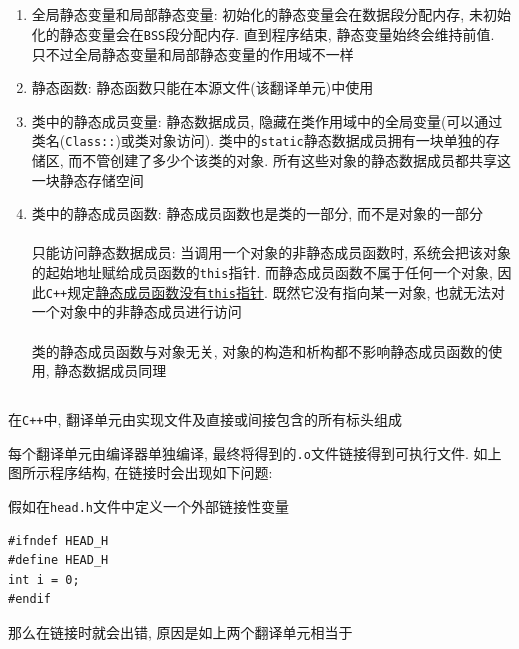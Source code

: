 \subsection{}
\begin{enumerate}
	\item 全局静态变量和局部静态变量: 初始化的静态变量会在数据段分配内存, 未初始化的静态变量会在{\tt BSS}段分配内存. 
			直到程序结束, 静态变量始终会维持前值. 只不过全局静态变量和局部静态变量的作用域不一样
	\item 静态函数: 静态函数只能在本源文件(该翻译单元)中使用
	\item 类中的静态成员变量: 静态数据成员, 隐藏在类作用域中的全局变量(可以通过类名({\tt Class::})或类对象访问). 
			类中的{\tt static}静态数据成员拥有一块单独的存储区, 而不管创建了多少个该类的对象. 
			所有这些对象的静态数据成员都共享这一块静态存储空间
	\item 类中的静态成员函数: 静态成员函数也是类的一部分, 而不是对象的一部分
		\\ \\  只能访问静态数据成员: 
			当调用一个对象的非静态成员函数时, 系统会把该对象的起始地址赋给成员函数的{\tt this}指针. 
			而静态成员函数不属于任何一个对象, 因此{\tt C++}规定\uline{静态成员函数没有{\tt this}指针}. 
			既然它没有指向某一对象, 也就无法对一个对象中的非静态成员进行访问
		\\ \\  类的静态成员函数与对象无关, 对象的构造和析构都不影响静态成员函数的使用, 静态数据成员同理
\end{enumerate}
\subsection{}

在{\tt C++}中, 翻译单元由实现文件及直接或间接包含的所有标头组成



\noindent 每个翻译单元由编译器单独编译, 最终将得到的{\tt .o}文件链接得到可执行文件. 如上图所示程序结构, 在链接时会出现如下问题:

假如在{\tt head.h}文件中定义一个外部链接性变量

\begin{lstlisting}[xleftmargin=2em]
#ifndef HEAD_H
#define HEAD_H
int i = 0;
#endif
\end{lstlisting}
那么在链接时就会出错, 原因是如上两个翻译单元相当于

